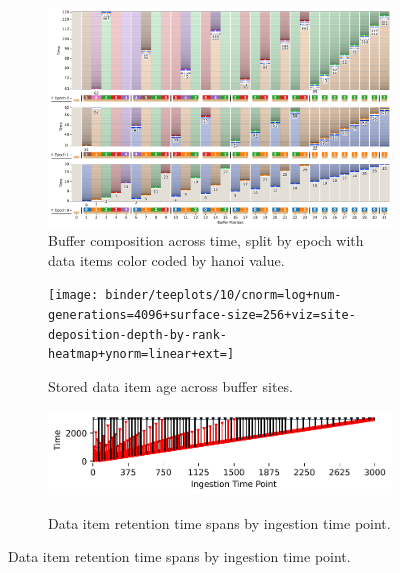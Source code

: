 \begin{figure}[h!]
  \centering

\begin{subfigure}[b]{\linewidth}
\includegraphics[width=\linewidth]{
binder/teeplots/10/num-generations=128+reservation-mode=steady+surface-size=32+viz=site-reservation-by-rank-spliced-at-heatmap+ext=}
\caption{
  Buffer composition across time, split by epoch with data items color coded by hanoi value.
}
\end{subfigure}

 \begin{minipage}[]{\textwidth}
 \vspace{-2pt}
  \begin{subfigure}[t]{0.7\linewidth}
    \vspace{0pt}
    \centering
  \texttt{[image: binder/teeplots/10/cnorm=log+num-generations=4096+surface-size=256+viz=site-deposition-depth-by-rank-heatmap+ynorm=linear+ext=]}
  \end{subfigure}%
  \begin{subfigure}[t]{0.3\linewidth}
  \vspace{-2pt}
  \caption{%
    Stored data item age across buffer sites.
  }
\end{subfigure}
\end{minipage}

   \begin{minipage}[]{\textwidth}
   \vspace{-2pt}
  \begin{subfigure}[t]{0.7\linewidth}
  \vspace{0pt}
    \centering
    \includegraphics[width=0.88\linewidth,clip]{binder/teeplots/10/num-generations=262144+surface-size=64+viz=stratum-persistence-dripplot+ext=}
  \end{subfigure}%
  \begin{subfigure}[t]{0.3\linewidth}
  \vspace{-2pt}
  \caption{%
    Data item retention time spans by ingestion time point.
  }
  \end{subfigure}
  \end{minipage}


\end{figure}
